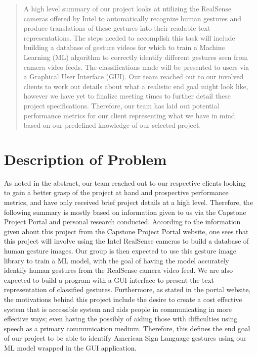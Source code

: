 \documentclass[onecolumn, draftclsnofoot,10pt, compsoc]{IEEEtran}
\begin{document}
\begin{titlepage}
\begin{singlespace}
\begin{abstract}
        	 A high level summary of our project looks at utilizing the RealSense cameras offered by Intel to automatically recognize human gestures and produce translations of these gestures into their readable text representations. The steps needed to accomplish this task will include building a database of gesture videos for which to train a Machine Learning (ML) algorithm to correctly identify different gestures seen from camera video feeds. The classifications made will be presented to users via a Graphical User Interface (GUI). Our team reached out to our involved clients to work out details about what a realistic end goal might look like, however we have yet to finalize meeting times to further detail these project specifications. Therefore, our team has laid out potential performance metrics for our client representing what we have in mind based on our predefined knowledge of our selected project.
        \end{abstract}     
    \end{singlespace}
\end{titlepage}
\newpage
{}
\tableofcontents
\clearpage

\newpage
\section{Description of Problem}
As noted in the abstract, our team reached out to our respective clients looking to gain a better grasp of the project at hand and prospective performance metrics, and have only received brief project details at a high level. Therefore, the following summary is mostly based on information given to us via the Capstone Project Portal and personal research conducted. According to the information given about this project from the Capstone Project Portal website, one sees that this project will involve using the Intel RealSense cameras to build a database of human gesture images. Our group is then expected to use this gesture image library to train a ML model, with the goal of having the model accurately identify human gestures from the RealSense camera video feed. We are also expected to build a program with a GUI interface to present the text representation of classified gestures. Furthermore, as stated in the portal website, the motivations behind this project include the desire to create a cost effective system that is accessible system and aids people in communicating in more effective ways; even having the possibly of aiding those with difficulties using speech as a primary communication medium\cite{first}. Therefore, this defines the end goal of our project to be able to identify American Sign Language gestures using our ML model wrapped in the GUI application.
\end{document}
